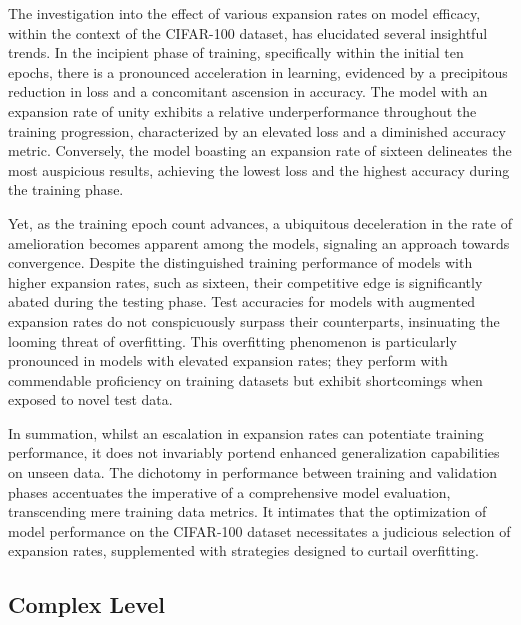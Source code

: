 \documentclass[10pt,twocolumn,letterpaper]{article}
\begin{document}
The investigation into the effect of various expansion rates on model efficacy, within the context of the CIFAR-100 dataset, has elucidated several insightful trends. In the incipient phase of training, specifically within the initial ten epochs, there is a pronounced acceleration in learning, evidenced by a precipitous reduction in loss and a concomitant ascension in accuracy. The model with an expansion rate of unity exhibits a relative underperformance throughout the training progression, characterized by an elevated loss and a diminished accuracy metric. Conversely, the model boasting an expansion rate of sixteen delineates the most auspicious results, achieving the lowest loss and the highest accuracy during the training phase.

Yet, as the training epoch count advances, a ubiquitous deceleration in the rate of amelioration becomes apparent among the models, signaling an approach towards convergence. Despite the distinguished training performance of models with higher expansion rates, such as sixteen, their competitive edge is significantly abated during the testing phase. Test accuracies for models with augmented expansion rates do not conspicuously surpass their counterparts, insinuating the looming threat of overfitting. This overfitting phenomenon is particularly pronounced in models with elevated expansion rates; they perform with commendable proficiency on training datasets but exhibit shortcomings when exposed to novel test data.

In summation, whilst an escalation in expansion rates can potentiate training performance, it does not invariably portend enhanced generalization capabilities on unseen data. The dichotomy in performance between training and validation phases accentuates the imperative of a comprehensive model evaluation, transcending mere training data metrics. It intimates that the optimization of model performance on the CIFAR-100 dataset necessitates a judicious selection of expansion rates, supplemented with strategies designed to curtail overfitting.

\subsection{Complex Level}
\end{document}
